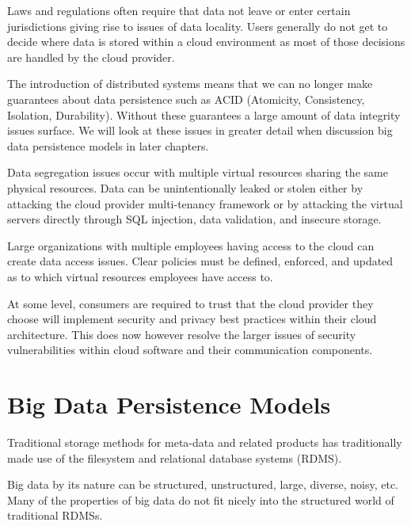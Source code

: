 \documentclass[]{article}
\begin{document}
Laws and regulations often require that data not leave or enter certain jurisdictions giving rise to issues of data locality. Users generally do not get to decide where data is stored within a cloud environment as most of those decisions are handled by the cloud provider.

The introduction of distributed systems means that we can no longer make guarantees about data persistence such as ACID (Atomicity, Consistency, Isolation, Durability). Without these guarantees a large amount of data integrity issues surface. We will look at these issues in greater detail when discussion big data persistence models in later chapters.

Data segregation issues occur with multiple virtual resources sharing the same physical resources. Data can be unintentionally leaked or stolen either by attacking the cloud provider multi-tenancy framework or by attacking the virtual servers directly through SQL injection, data validation, and insecure storage.

Large organizations with multiple employees having access to the cloud can create data access issues. Clear policies must be defined, enforced, and updated as to which virtual resources employees have access to. 



At some level, consumers are required to trust that the cloud provider they choose will implement security and privacy best practices within their cloud architecture. This does now however resolve the larger issues of security vulnerabilities within cloud software and their communication components.



\section{Big Data Persistence Models} \label{sec:big-data-persistence-models}
Traditional storage methods for meta-data and related products has traditionally made use of the filesystem and relational database systems (RDMS).

Big data by its nature can be structured, unstructured, large, diverse, noisy, etc. Many of the properties of big data do not fit nicely into the structured world of traditional RDMSs.
\end{document}
